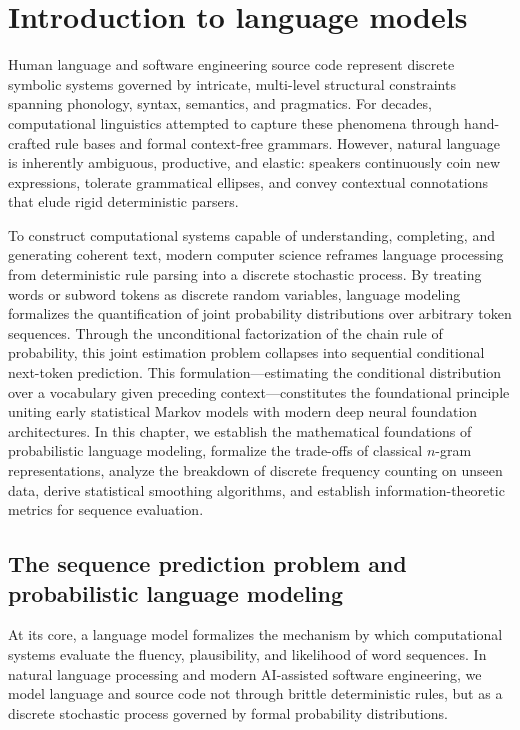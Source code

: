 \documentclass[../../main.tex]{subfiles}
\begin{document}
\chapter{Introduction to language models}
\label{ch:intro_lms}

Human language and software engineering source code represent discrete symbolic systems governed by intricate, multi-level structural constraints spanning phonology, syntax, semantics, and pragmatics. For decades, computational linguistics attempted to capture these phenomena through hand-crafted rule bases and formal context-free grammars. However, natural language is inherently ambiguous, productive, and elastic: speakers continuously coin new expressions, tolerate grammatical ellipses, and convey contextual connotations that elude rigid deterministic parsers.

To construct computational systems capable of understanding, completing, and generating coherent text, modern computer science reframes language processing from deterministic rule parsing into a discrete stochastic process. By treating words or subword tokens as discrete random variables, language modeling formalizes the quantification of joint probability distributions over arbitrary token sequences. Through the unconditional factorization of the chain rule of probability, this joint estimation problem collapses into sequential conditional next-token prediction. This formulation—estimating the conditional distribution over a vocabulary given preceding context—constitutes the foundational principle uniting early statistical Markov models with modern deep neural foundation architectures. In this chapter, we establish the mathematical foundations of probabilistic language modeling, formalize the trade-offs of classical $n$-gram representations, analyze the breakdown of discrete frequency counting on unseen data, derive statistical smoothing algorithms, and establish information-theoretic metrics for sequence evaluation.

\clearpage
\section{The sequence prediction problem and probabilistic language modeling}
\label{sec:prob_lm}

At its core, a language model formalizes the mechanism by which computational systems evaluate the fluency, plausibility, and likelihood of word sequences. In natural language processing and modern AI-assisted software engineering, we model language and source code not through brittle deterministic rules, but as a discrete stochastic process governed by formal probability distributions.
\end{document}
